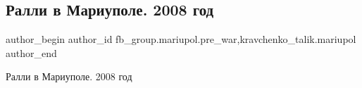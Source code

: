  
 
 
 
 

\subsection{Ралли в Мариуполе. 2008 год}
\label{sec:16_02_2023.fb.fb_group.mariupol.pre_war.5.ralli_v_mariupole__2}
 
\ifcmt
 author_begin
   author_id fb_group.mariupol.pre_war,kravchenko_talik.mariupol
 author_end
\fi

Ралли в Мариуполе. 2008 год

